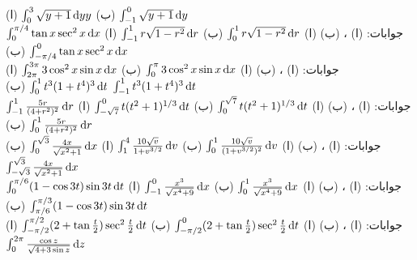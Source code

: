 (ا) \quad
$\int_0^3\sqrt{y+1}\dif yy$\quad
(ب)\quad
$\int_{-1}^0\sqrt{y+1}\dif y$\\
جوابات:\quad
(ا) ، (ب) 
(ا)\quad
$\int_0^1r\sqrt{1-r^2}\dif r$\quad
(ب) \quad
$\int_{-1}^1r\sqrt{1-r^2}\dif r$
(ا)\quad
$\int_0^{\pi/4}\tan x\sec^2x\dif x$\quad
(ب) \quad
$\int_{-\pi/4}^0\tan x\sec^2x\dif x$\\
جوابات:\quad
(ا) ، (ب) 
(ا)\quad
$\int_0^{\pi}3\cos^2x\sin x\dif x$\quad
(ب) \quad
$\int_{2\pi}^{3\pi}3\cos^2x\sin x\dif x$
(ا)\quad
$\int_0^1t^3(1+t^4)^3\dif t$\quad
(ب) \quad
$\int_{-1}^1t^3(1+t^4)^3\dif t$\\
جوابات:\quad
(ا) ، (ب) 
(ا)\quad
$\int_0^{\sqrt{7}}t(t^2+1)^{1/3}\dif t$\quad
(ب) \quad
$\int_{-\sqrt{7}}^0t(t^2+1)^{1/3}\dif t$
(ا)\quad
$\int_{-1}^1\tfrac{5r}{(4+r^2)^2}\dif r$\quad
(ب) \quad
$\int_0^1\tfrac{5r}{(4+r^2)^2}\dif r$\\
جوابات:\quad
(ا) ، (ب) 
(ا)\quad
$\int_0^1\tfrac{10\sqrt{v}}{(1+v^{3/2})^2}\dif v$\quad
(ب) \quad
$\int_1^4\tfrac{10\sqrt{v}}{1+v^{3/2}}\dif v$
(ا)\quad
$\int_0^{\sqrt{3}}\tfrac{4x}{\sqrt{x^2+1}}\dif x$\quad
(ب) \quad
$\int_{-\sqrt{3}}^{\sqrt{3}}\tfrac{4x}{\sqrt{x^2+1}}\dif x$\\
جوابات:\quad
(ا) ، (ب) 
(ا)\quad
$\int_0^1\tfrac{x^3}{\sqrt{x^4+9}}\dif x$\quad
(ب) \quad
$\int_{-1}^0\tfrac{x^3}{\sqrt{x^4+9}}\dif x$
(ا)\quad
$\int_0^{\pi/6}(1-\cos 3t)\sin 3t\dif t$\quad
(ب) \quad
$\int_{\pi/6}^{\pi/3}(1-\cos 3t)\sin 3t\dif t$\\
جوابات:\quad
(ا) ، (ب) 
(ا)\quad
$\int_{-\pi/2}^0(2+\tan\tfrac{t}{2})\sec^2\tfrac{t}{2}\dif t$\quad
(ب) \quad
$\int_{-\pi/2}^{\pi/2}(2+\tan\tfrac{t}{2})\sec^2\tfrac{t}{2}\dif t$
(ا)\quad
$\int_0^{2\pi}\tfrac{\cos z}{\sqrt{4+3\sin z}}\dif z$\quad
